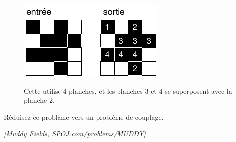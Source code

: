 \documentclass[12pt]{article}
\newcommand{\source}[1]{\begin{flushright}\emph{[#1]}\end{flushright}}
\begin{document}
\begin{figure}[h]
	\centerline{\includegraphics{boue.pdf}}
	Cette utilise 4 planches, et les planches 3 et 4 se superposent avec la planche 2.
\end{figure}

Réduisez ce problème vers un problème de couplage.




\source{Muddy Fields, SPOJ.com/problems/MUDDY}
\end{document}
